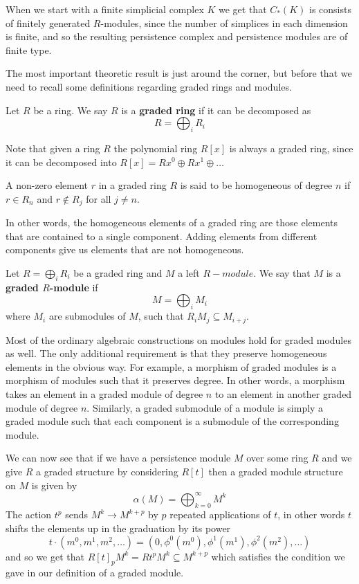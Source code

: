 When we start with a finite simplicial complex $K$ we get that $C_{*}(K)$ is consists of finitely generated $R$-modules, since the number of simplices in each dimension is finite, and so the resulting persistence complex and persistence modules are of finite type.

The most important theoretic result is just around the corner, but before that we need to recall some definitions regarding graded rings and modules.

\begin{definition}
  Let $R$ be a ring. We say $R$ is a \textbf{graded ring} if it can be decomposed as
  \[ R = \bigoplus_{i} R_{i}\]
\end{definition}
Note that given a ring $R$ the polynomial ring $R[x]$ is always a graded ring, since it can be decomposed into $R[x] = Rx^{0} \oplus Rx^{1} \oplus \dots$

\begin{definition}
A non-zero element $r$ in a graded ring $R$ is said to be homogeneous of degree $n$ if $r \in R_{n}$ and $r \not \in R_{j}$ for all $j \neq n$.
\end{definition}

In other words, the homogeneous elements of a graded ring are those elements that are contained to a single component. Adding elements from different components give us elements that are not homogeneous.
\begin{definition}
  Let $R = \bigoplus_{{i}} R_{i}$ be a graded ring and $M$ a left $R-module$. We say that $M$ is a \textbf{graded $R$-module} if
  \[M = \bigoplus_{i} M_{i} \]
  where $M_{i}$ are submodules of $M$, such that $R_{i}M_{j} \subseteq M_{i+j}$.
\end{definition}

Most of the ordinary algebraic constructions on modules hold for graded modules as well. The only additional requirement is that they preserve homogeneous elements in the obvious way. For example, a morphism of graded modules is a morphism of modules such that it preserves degree. In other words, a morphism takes an element in a graded module of degree $n$ to an element in another graded module of degree $n$. Similarly, a graded submodule of a module is simply a graded module such that each component is a submodule of the corresponding module.

We can now see that if we have a persistence module $M$ over some ring $R$ and we give $R$ a graded structure by considering $R[t]$ then a graded module structure on $M$ is given by
\[ \alpha(M) = \bigoplus^{\infty}_{k=0} M^{k}\]
The action $t^{p}$ sends $M^{k} \to M^{k+p}$ by $p$ repeated applications of $t$, in other words $t$ shifts the elements up in the graduation by its power
\[ t \cdot (m^{0}, m^{1}, m^{2}, \dots  ) = (0, \phi^{0}(m^{0}), \phi^{1}(m^{1}),\phi^{2}(m^{2}),\dots) \]
and so we get that $R[t]_{p}M^{k} = Rt^{p}M^{k} \subseteq M^{k+p}$ which satisfies the condition we gave in our definition of a graded module.

